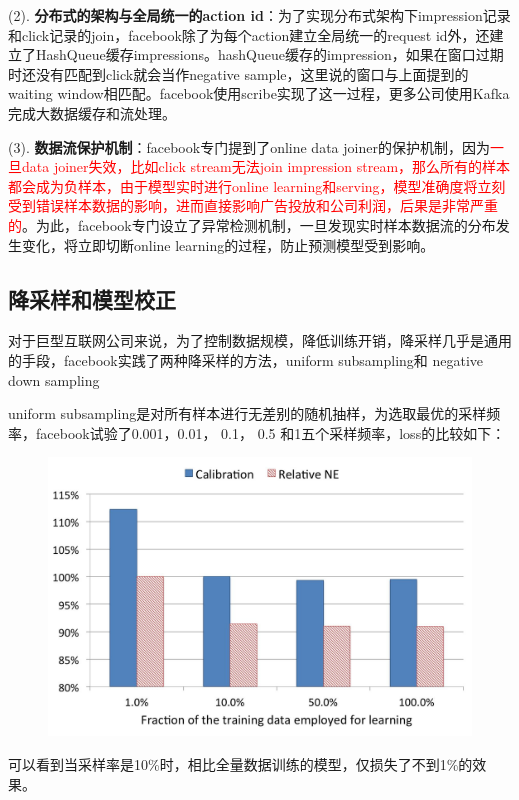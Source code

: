 \documentclass[12pt]{article}
\begin{document}
(2). \textbf{分布式的架构与全局统一的action id}：为了实现分布式架构下impression记录和click记录的join，facebook除了为每个action建立全局统一的request id外，还建立了HashQueue缓存impressions。hashQueue缓存的impression，如果在窗口过期时还没有匹配到click就会当作negative sample，这里说的窗口与上面提到的waiting window相匹配。facebook使用scribe实现了这一过程，更多公司使用Kafka完成大数据缓存和流处理。

(3). \textbf{数据流保护机制}：facebook专门提到了online data joiner的保护机制，因为\textcolor{red}{一旦data joiner失效，比如click stream无法join impression stream，那么所有的样本都会成为负样本，由于模型实时进行online learning和serving，模型准确度将立刻受到错误样本数据的影响，进而直接影响广告投放和公司利润，后果是非常严重的}。为此，facebook专门设立了异常检测机制，一旦发现实时样本数据流的分布发生变化，将立即切断online learning的过程，防止预测模型受到影响。

\subsection{降采样和模型校正}
对于巨型互联网公司来说，为了控制数据规模，降低训练开销，降采样几乎是通用的手段，facebook实践了两种降采样的方法，uniform subsampling和 negative down sampling

uniform subsampling是对所有样本进行无差别的随机抽样，为选取最优的采样频率，facebook试验了0.001，0.01， 0.1， 0.5 和1五个采样频率，loss的比较如下：
\begin{figure}[H]
    \centering
    \includegraphics[width=.6\textwidth]{fig/Facebook_DownSample.jpg}
\end{figure}
可以看到当采样率是10\%时，相比全量数据训练的模型，仅损失了不到1\%的效果。
\end{document}

